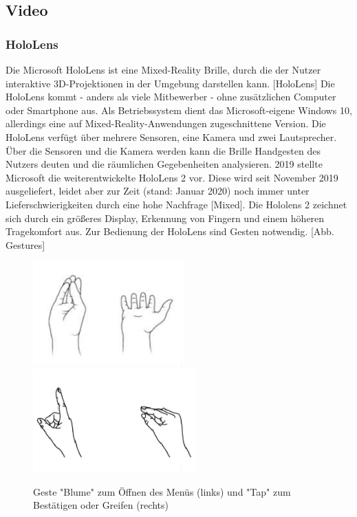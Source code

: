 \documentclass[11pt, titlepage, fleqn]{report}
\begin{document}
                    \subsection{Video}
            \label{sec:2.3.2Video}
                \subsubsection{HoloLens}
                    Die Microsoft HoloLens ist eine Mixed-Reality Brille, durch die der Nutzer interaktive 3D-Projektionen in der Umgebung darstellen kann.
                    [HoloLens]\newline
                    Die HoloLens kommt - anders als viele Mitbewerber - ohne zusätzlichen Computer oder Smartphone aus.
                    Als Betriebssystem dient das Microsoft-eigene Windows 10, allerdings eine auf Mixed-Reality-Anwendungen zugeschnittene Version.
                    Die HoloLens verfügt über mehrere Sensoren, eine Kamera und zwei Lautsprecher.
                    Über die Sensoren und die Kamera werden kann die Brille Handgesten des Nutzers deuten und die räumlichen Gegebenheiten analysieren.
                    2019 stellte Microsoft die weiterentwickelte HoloLens 2 vor. Diese wird seit November 2019 ausgeliefert, leidet aber zur Zeit 
                    (stand: Januar 2020) noch immer unter Lieferschwierigkeiten durch eine hohe Nachfrage [Mixed]. Die Hololens 2 zeichnet sich durch 
                    ein größeres Display, Erkennung von Fingern und einem höheren Tragekomfort aus.
                    Zur Bedienung der HoloLens sind Gesten notwendig. [Abb. Gestures]
                    \begin{figure}[htbp]
                        \centering
                        \includegraphics[height=4cm]{./img/Gesture1.png}
                        \includegraphics[height=4cm]{./img/Gesture2.png}
                        \caption{Geste "Blume" zum Öffnen des Menüs (links) und "Tap" zum Bestätigen oder Greifen (rechts) \label{fig:Gestures}}
                    \end{figure}
\end{document}
